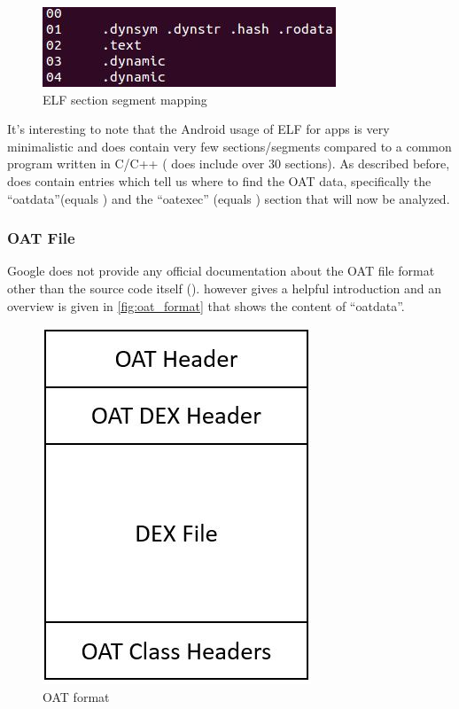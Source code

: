 \begin{figure}[htb]
  \centering
  \includegraphics[scale=0.7]{figures/section_segment_mapping}
  \caption[ELF section segment mapping]{ELF section segment mapping}
  \label{fig:sections_segments_mapping}
\end{figure}

It's interesting to note that the Android usage of ELF for apps
is very minimalistic and does contain very few sections/segments
compared to a common program written in C/C++ (
does include over 30 sections). As described before,
 does contain entries which tell us where to find
the OAT data, specifically the ``oatdata''(equals )
and the ``oatexec'' (equals )
section that will now be analyzed.

\subsubsection{OAT File}\label{section:oat_file}
Google does not provide any official documentation about the OAT
file format other than the source code itself
(). \parencite{hiding_behind_art}
however gives a helpful introduction and an overview is given
in \autoref{fig:oat_format} that shows the content of ``oatdata''.

\begin{figure}[htb]
  \centering
  \includegraphics[scale=0.5]{figures/oat_format}
  \caption[OAT format]{OAT format}
  \label{fig:oat_format}
\end{figure}

